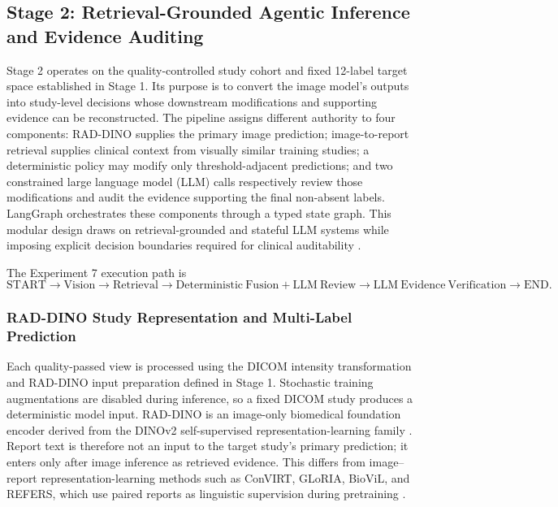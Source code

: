 \subsection{Stage 2: Retrieval-Grounded Agentic Inference and Evidence Auditing}
\label{sec:stage2}

Stage 2 operates on the quality-controlled study cohort and fixed 12-label target space established in Stage 1. Its purpose is to convert the image model's outputs into study-level decisions whose downstream modifications and supporting evidence can be reconstructed. The pipeline assigns different authority to four components: RAD-DINO supplies the primary image prediction; image-to-report retrieval supplies clinical context from visually similar training studies; a deterministic policy may modify only threshold-adjacent predictions; and two constrained large language model (LLM) calls respectively review those modifications and audit the evidence supporting the final non-absent labels. LangGraph orchestrates these components through a typed state graph. This modular design draws on retrieval-grounded and stateful LLM systems while imposing explicit decision boundaries required for clinical auditability \cite{lewis2020retrieval,guu2020realm,karpukhin2020dense,yao2023react,wu2024autogen,stateflow2024}.

The Experiment 7 execution path is
\[
\mathrm{START}\rightarrow
\mathrm{Vision}\rightarrow
\mathrm{Retrieval}\rightarrow
\mathrm{Deterministic\ Fusion+LLM\ Review}\rightarrow
\mathrm{LLM\ Evidence\ Verification}\rightarrow
\mathrm{END}.
\]

\subsubsection{RAD-DINO Study Representation and Multi-Label Prediction}

Each quality-passed view is processed using the DICOM intensity transformation and RAD-DINO input preparation defined in Stage 1. Stochastic training augmentations are disabled during inference, so a fixed DICOM study produces a deterministic model input. RAD-DINO is an image-only biomedical foundation encoder derived from the DINOv2 self-supervised representation-learning family \cite{perez-garcia_exploring_2025,oquab2024dinov2}. Report text is therefore not an input to the target study's primary prediction; it enters only after image inference as retrieved evidence. This differs from image--report representation-learning methods such as ConVIRT, GLoRIA, BioViL, and REFERS, which use paired reports as linguistic supervision during pretraining \cite{zhang2022convirt,huang2021gloria,boecking2022biovil,liu2022refers}.

